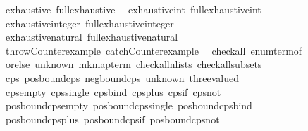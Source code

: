 \begin{isabellebody}
\ \ exhaustive\ full{\isacharunderscore}{\kern0pt}exhaustive\isanewline
\ \ exhaustive{\isacharunderscore}{\kern0pt}int{\isacharprime}{\kern0pt}\ full{\isacharunderscore}{\kern0pt}exhaustive{\isacharunderscore}{\kern0pt}int{\isacharprime}{\kern0pt}\isanewline
\ \ exhaustive{\isacharunderscore}{\kern0pt}integer{\isacharprime}{\kern0pt}\ full{\isacharunderscore}{\kern0pt}exhaustive{\isacharunderscore}{\kern0pt}integer{\isacharprime}{\kern0pt}\isanewline
\ \ exhaustive{\isacharunderscore}{\kern0pt}natural{\isacharprime}{\kern0pt}\ full{\isacharunderscore}{\kern0pt}exhaustive{\isacharunderscore}{\kern0pt}natural{\isacharprime}{\kern0pt}\isanewline
\ \ throw{\isacharunderscore}{\kern0pt}Counterexample\ catch{\isacharunderscore}{\kern0pt}Counterexample\isanewline
\ \ check{\isacharunderscore}{\kern0pt}all\ enum{\isacharunderscore}{\kern0pt}term{\isacharunderscore}{\kern0pt}of\isanewline
\ \ orelse\ unknown\ mk{\isacharunderscore}{\kern0pt}map{\isacharunderscore}{\kern0pt}term\ check{\isacharunderscore}{\kern0pt}all{\isacharunderscore}{\kern0pt}n{\isacharunderscore}{\kern0pt}lists\ check{\isacharunderscore}{\kern0pt}all{\isacharunderscore}{\kern0pt}subsets\isanewline
\isanewline
{}\isamarkupfalse%
\ {\isacharparenleft}{\kern0pt}\ cps\ pos{\isacharunderscore}{\kern0pt}bound{\isacharunderscore}{\kern0pt}cps\ neg{\isacharunderscore}{\kern0pt}bound{\isacharunderscore}{\kern0pt}cps\ unknown\ three{\isacharunderscore}{\kern0pt}valued\isanewline
\isanewline
{}\isamarkupfalse%
\ {\isacharparenleft}{\kern0pt}\ cps{\isacharunderscore}{\kern0pt}empty\ cps{\isacharunderscore}{\kern0pt}single\ cps{\isacharunderscore}{\kern0pt}bind\ cps{\isacharunderscore}{\kern0pt}plus\ cps{\isacharunderscore}{\kern0pt}if\ cps{\isacharunderscore}{\kern0pt}not\isanewline
\ \ pos{\isacharunderscore}{\kern0pt}bound{\isacharunderscore}{\kern0pt}cps{\isacharunderscore}{\kern0pt}empty\ pos{\isacharunderscore}{\kern0pt}bound{\isacharunderscore}{\kern0pt}cps{\isacharunderscore}{\kern0pt}single\ pos{\isacharunderscore}{\kern0pt}bound{\isacharunderscore}{\kern0pt}cps{\isacharunderscore}{\kern0pt}bind\isanewline
\ \ pos{\isacharunderscore}{\kern0pt}bound{\isacharunderscore}{\kern0pt}cps{\isacharunderscore}{\kern0pt}plus\ pos{\isacharunderscore}{\kern0pt}bound{\isacharunderscore}{\kern0pt}cps{\isacharunderscore}{\kern0pt}if\ pos{\isacharunderscore}{\kern0pt}bound{\isacharunderscore}{\kern0pt}cps{\isacharunderscore}{\kern0pt}not\isanewline

\end{isabellebody}

